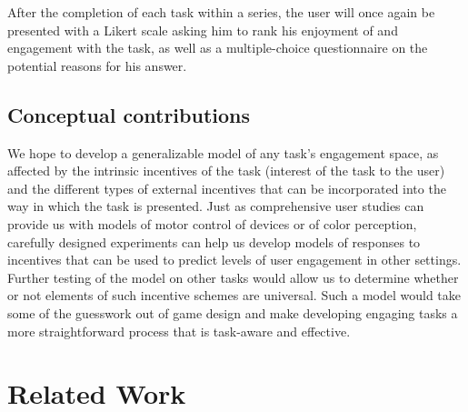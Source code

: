 \documentclass{sigchi}
\begin{document}
After the completion of each task within a series, the user will once again be presented with a Likert scale asking him to rank his enjoyment of and engagement with the task, as well as a multiple-choice questionnaire on the potential reasons for his answer.

\subsection{Conceptual contributions}

We hope to develop a generalizable model of any task's engagement space, as affected by the intrinsic incentives of the task (interest of the task to the user) and the different types of external incentives that can be incorporated into the way in which the task is presented. Just as comprehensive user studies can provide us with models of motor control of devices or of color perception, carefully designed experiments can help us develop models of responses to incentives that can be used to predict levels of user engagement in other settings. Further testing of the model on other tasks would allow us to determine whether or not elements of such incentive schemes are universal. Such a model would take some of the guesswork out of game design and make developing engaging tasks a more straightforward process that is task-aware and effective.

\section{Related Work}

%
%
%
%
%

 \small


\end{document}
